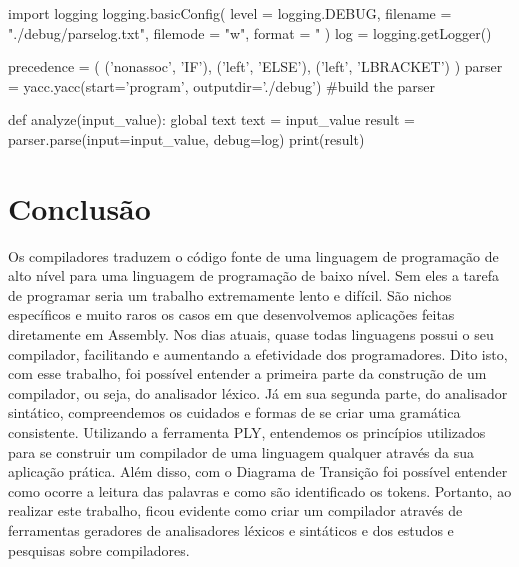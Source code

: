 \documentclass[
	12pt,				%
	openright,			%
	twoside,			%
	a4paper,			%
	english,			%
	french,				%
	spanish,			%
	brazil				%
	]{abntex2}
\begin{document}
\begin{python}
import logging
logging.basicConfig(
    level = logging.DEBUG,
    filename = "./debug/parselog.txt",
    filemode = "w",
    format = "%
)
log = logging.getLogger()

precedence = (
    ('nonassoc', 'IF'), 
    ('left', 'ELSE'),
    ('left', 'LBRACKET')
)
parser = yacc.yacc(start='program', outputdir='./debug')  #build the parser

def analyze(input_value):
    global text
    text = input_value
    result = parser.parse(input=input_value, debug=log)
    print(result)
\end{python}

\chapter*[Conclusão]{Conclusão}
Os compiladores traduzem o código fonte de uma linguagem de programação
de alto nível para uma linguagem de programação de baixo nível. Sem eles 
a tarefa de programar seria um trabalho extremamente lento e difícil.
São nichos específicos e muito raros os casos em que desenvolvemos
aplicações feitas diretamente em Assembly. Nos dias atuais, quase todas linguagens
possui o seu compilador, facilitando e aumentando a efetividade dos programadores.
Dito isto, com esse trabalho, foi possível entender a primeira parte da construção
de um compilador, ou seja, do analisador léxico. Já em sua segunda parte, do analisador sintático,
compreendemos os cuidados e formas de se criar uma gramática consistente. Utilizando a ferramenta PLY,
entendemos os princípios utilizados para se construir um compilador de uma
linguagem qualquer através da sua aplicação prática. Além disso, com o Diagrama
de Transição foi possível entender como ocorre a leitura das palavras e como são
identificado os tokens. Portanto, ao realizar este trabalho,
ficou evidente como criar um compilador através de ferramentas geradores de 
analisadores léxicos e sintáticos e dos estudos e pesquisas sobre compiladores.


\postextual



%
%

\printindex
\end{document}
